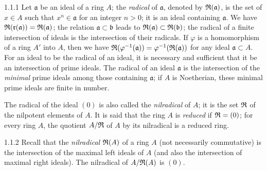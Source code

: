 
\begin{env}{1.1.1}
\label{env-0.1.1.1}
Let $\mathfrak{a}$ be an ideal of a ring $A$; the \emph{radical} of $\mathfrak{a}$, denoted
by $\mathfrak{R}(\mathfrak{a})$, is the set of $x\in A$ such that $x^n\in\mathfrak{a}$ for
an integer $n>0$; it is an ideal containing $\mathfrak{a}$. We have
$\mathfrak{R}(\mathfrak{r}(\mathfrak{a}))=\mathfrak{R}(\mathfrak{a})$; the relation
$\mathfrak{a}\subset\mathfrak{b}$ leads to $\mathfrak{R}(\mathfrak{a})\subset\mathfrak{R}(\mathfrak{b})$;
the radical of a finite intersection of ideals is the intersection of their radicals. If $\varphi$
is a homomorphism of a ring $A'$ into $A$, then we have
$\mathfrak{R}(\varphi^{-1}(\mathfrak{a}))=\varphi^{-1}(\mathfrak{R}(\mathfrak{a}))$
for any ideal $\mathfrak{a}\subset A$. For an ideal to be the radical of an ideal,
it is necessary and sufficient that it be an intersection of prime ideals. The radical of an
ideal $\mathfrak{a}$ is the intersection of the
\emph{minimal} prime ideals among those containing $\mathfrak{a}$; if $A$ is
Noetherian, these minimal prime ideals are finite in number.

The radical of the ideal $(0)$ is also called the \emph{nilradical} of $A$; it is the set
$\mathfrak{R}$ of the nilpotent elements of $A$. It is said that the ring $A$ is \emph{reduced} if
$\mathfrak{R}=(0)$; for every ring $A$, the quotient $A/\mathfrak{R}$ of $A$ by its nilradical is a
reduced ring.
\end{env}

\begin{env}{1.1.2}
\label{env-0.1.1.2}
Recall that the \emph{nilradical} $\mathfrak{R}(A)$ of a ring $A$ (not necessarily commutative) is the
intersection of the maximal left ideals of $A$ (and also the intersection of maximal
right ideals). The nilradical of $A/\mathfrak{R}(A)$ is $(0)$.
\end{env}

